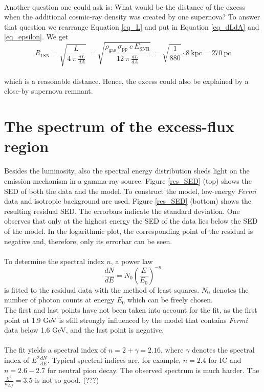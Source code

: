 \documentclass[a4paper]{article}
\begin{document}
\\
Another question one could ask is: What would be the distance of the excess when the additional cosmic-ray density was created by one supernova? To answer that question we rearrange Equation \ref{eq_L} and put in Equation \ref{eq_dLdA} and \ref{eq_epsilon}. We get
\begin{equation}
R_\text{1SN} = \sqrt{\frac{L}{4\ \pi\ \frac{dL}{dA}}}\ = \sqrt{\frac{\rho_\text{gas}\ \sigma_\text{pp}\ c\ E_\text{SNR}}{12\ \pi\ \frac{dL}{dA}}}\ = \sqrt{\frac{1}{880}}\cdot 8\ \text{kpc} = 270\ \text{pc}
\end{equation}\\
which is a reasonable distance. Hence, the excess could also be explained by a close-by supernova remnant.



\section{The spectrum of the excess-flux region}
Besides the luminosity, also the spectral energy distribution sheds light on the emission mechanism in a gamma-ray source. Figure \ref{res_SED} (top) shows the SED of both the data and the model. To construct the model, low-energy \textit{Fermi} data and isotropic background are used. Figure \ref{res_SED} (bottom) shows the resulting residual SED. The errorbars indicate the standard deviation. One observes that only at the highest energy the SED of the data lies below the SED of the model. In the logarithmic plot, the corresponding point of the residual is negative and, therefore, only its errorbar can be seen.\\
\\
To determine the spectral index $n$, a power law 
\begin{equation}
\frac{dN}{dE} = N_0 \left( \frac{E}{E_0}\right)^{-n}
\end{equation}
is fitted to the residual data with the method of least squares. $N_0$ denotes the number of photon counts at energy $E_0$ which can be freely chosen.\\
The first and last points have not been taken into account for the fit, as the first point at 1.9 GeV is still strongly influenced by the model that contains \textit{Fermi} data below 1.6 GeV, and the last point is negative.\\
\\
The fit yields a spectral index of {\boldmath$n = 2 + \gamma = 2.16$}, where $\gamma$ denotes the spectral index of $E^2 \frac{dN}{dE}$. Typical spectral indices are, for example, {\boldmath$n = 2.4$} for IC and {\boldmath$n = 2.6 - 2.7$} for neutral pion decay. The observed spectrum is much harder. The {\boldmath$\frac{\chi^2}{n_{dof}} = 3.5$} is not so good. (???)\\
\end{document}

